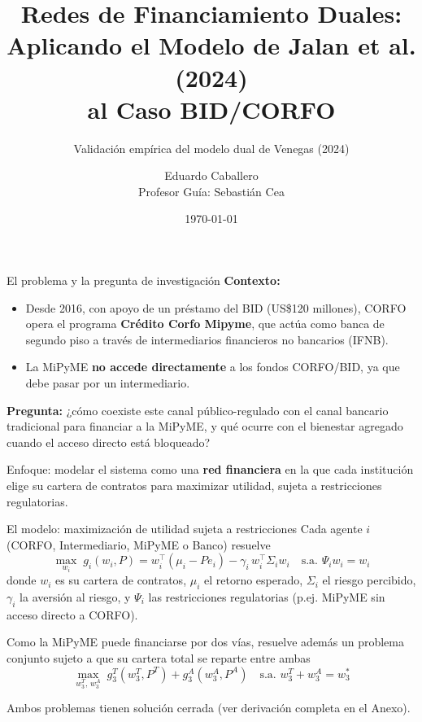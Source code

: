 \documentclass[aspectratio=169]{beamer}
\title[Redes Duales BID/CORFO]{Redes de Financiamiento Duales: \\ Aplicando el Modelo de Jalan et al. (2024) \\ al Caso BID/CORFO}
\subtitle{Validación empírica del modelo dual de Venegas (2024)}
\author[Eduardo Caballero]{Eduardo Caballero \\ \small{Profesor Guía: Sebastián Cea}}
\institute{Universidad de Los Andes}
\date{\today}
\begin{document}
\frame{\titlepage}

\begin{frame}{El problema y la pregunta de investigación}
\textbf{Contexto:}
\begin{itemize}
    \item Desde 2016, con apoyo de un préstamo del BID (US\$120 millones), CORFO opera el programa \textbf{Crédito Corfo Mipyme}, que actúa como banca de segundo piso a través de intermediarios financieros no bancarios (IFNB).
    \item La MiPyME \textbf{no accede directamente} a los fondos CORFO/BID, ya que debe pasar por un intermediario.
\end{itemize}

\vspace{0.3cm}
\textbf{Pregunta:} ¿cómo coexiste este canal público-regulado con el canal bancario tradicional para financiar a la MiPyME, y qué ocurre con el bienestar agregado cuando el acceso directo está bloqueado?

\vspace{0.3cm}
\alert{Enfoque:} modelar el sistema como una \textbf{red financiera} en la que cada institución elige su cartera de contratos para maximizar utilidad, sujeta a restricciones regulatorias.
\end{frame}

\begin{frame}{El modelo: maximización de utilidad sujeta a restricciones}
Cada agente $i$ (CORFO, Intermediario, MiPyME o Banco) resuelve
\begin{equation*}
\max_{w_i} \; g_i(w_i,P) = w_i^\top(\mu_i - Pe_i) - \gamma_i\, w_i^\top \Sigma_i w_i \quad \text{s.a. } \Psi_i w_i = w_i
\end{equation*}
donde $w_i$ es su cartera de contratos, $\mu_i$ el retorno esperado, $\Sigma_i$ el riesgo percibido, $\gamma_i$ la aversión al riesgo, y $\Psi_i$ las restricciones regulatorias (p.ej. MiPyME sin acceso directo a CORFO).

\vspace{0.3cm}
Como la MiPyME puede financiarse por dos vías, resuelve además un problema conjunto sujeto a que su cartera total se reparte entre ambas
\begin{equation*}
\max_{w_3^T,\, w_3^A} \; g_3^T(w_3^T,P^T) + g_3^A(w_3^A,P^A) \quad \text{s.a. } w_3^T + w_3^A = w_3^*
\end{equation*}

\vspace{0.2cm}
\footnotesize{Ambos problemas tienen solución cerrada (ver derivación completa en el Anexo).}
\end{frame}
\end{document}
